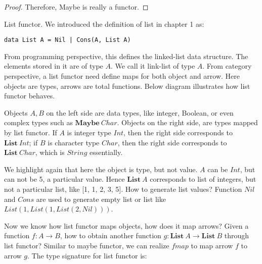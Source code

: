 \documentclass{article}
\begin{document}
\begin{example}
\begin{mdframed}
\begin{proof}
Therefore, Maybe is really a functor.
\end{proof}
\end{mdframed}
\end{example}

\begin{example}
\normalfont
{}
List functor. We introduced the definition of list in chapter 1 as:

\lstset{frame=none}
\begin{lstlisting}
data List A = Nil | Cons(A, List A)
\end{lstlisting}

From programming perspective, this defines the linked-list data structure. The elements stored in it are of type $A$. We call it link-list of type $A$. From category perspective, a list functor need define maps for both object and arrow. Here objects are types, arrows are total functions. Below diagram illustrates how list functor behaves.

\begin{center}
\end{center}

Objects $A, B$ on the left side are data types, like integer, Boolean, or even complex types such as $\mathbf{Maybe}\ Char$. Objects on the right side, are types mapped by list functor. If $A$ is integer type $Int$, then the right side corresponds to $\mathbf{List}\ Int$; if $B$ is character type $Char$, then the right side corresponds to $\mathbf{List}\ Char$, which is $String$ essentially.

We highlight again that here the object is type, but not value. $A$ can be $Int$, but can not be 5, a particular value. Hence $\mathbf{List}\ A$ corresponds to list of integers, but not a particular list, like [1, 1, 2, 3, 5]. How to generate list values? Function $Nil$ and $Cons$ are used to generate empty list or list like $List(1, List(1, List(2, Nil)))$.

Now we know how list functor maps objects, how does it map arrows? Given a function $f: A \to B$, how to obtain another function $g: \mathbf{List}\ A \to \mathbf{List}\ B$ through list functor? Similar to maybe functor, we can realize $fmap$ to map arrow $f$ to arrow $g$. The type signature for list functor is:


\end{example}
\end{document}
